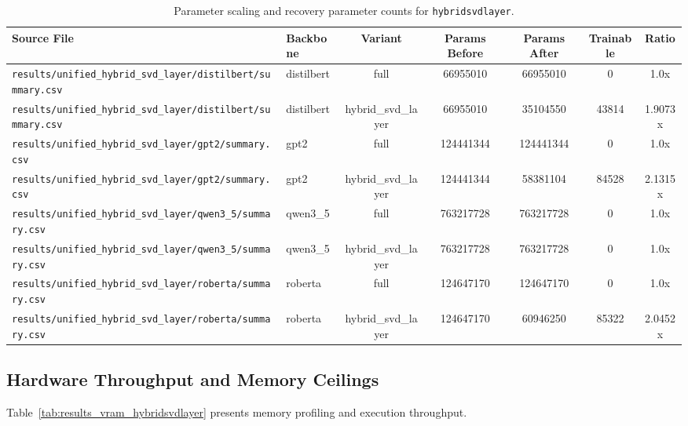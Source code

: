 \begin{table}[t]
\centering
\small
\begin{tabular}{llccccc}
\toprule
\textbf{Source File} & \textbf{Backbone} & \textbf{Variant} & \textbf{Params Before} & \textbf{Params After} & \textbf{Trainable} & \textbf{Ratio} \\
\midrule
\texttt{results/unified\_hybrid\_svd\_layer/distilbert/summary.csv} & distilbert & full & 66955010 & 66955010 & 0 & 1.0x \\
\texttt{results/unified\_hybrid\_svd\_layer/distilbert/summary.csv} & distilbert & hybrid\_svd\_layer & 66955010 & 35104550 & 43814 & 1.9073x \\
\texttt{results/unified\_hybrid\_svd\_layer/gpt2/summary.csv} & gpt2 & full & 124441344 & 124441344 & 0 & 1.0x \\
\texttt{results/unified\_hybrid\_svd\_layer/gpt2/summary.csv} & gpt2 & hybrid\_svd\_layer & 124441344 & 58381104 & 84528 & 2.1315x \\
\texttt{results/unified\_hybrid\_svd\_layer/qwen3\_5/summary.csv} & qwen3\_5 & full & 763217728 & 763217728 & 0 & 1.0x \\
\texttt{results/unified\_hybrid\_svd\_layer/qwen3\_5/summary.csv} & qwen3\_5 & hybrid\_svd\_layer & 763217728 & 763217728 & 0 & 1.0x \\
\texttt{results/unified\_hybrid\_svd\_layer/roberta/summary.csv} & roberta & full & 124647170 & 124647170 & 0 & 1.0x \\
\texttt{results/unified\_hybrid\_svd\_layer/roberta/summary.csv} & roberta & hybrid\_svd\_layer & 124647170 & 60946250 & 85322 & 2.0452x \\
\bottomrule
\end{tabular}
\caption{Parameter scaling and recovery parameter counts for \texttt{hybridsvdlayer}.}
\label{tab:results_params_hybridsvdlayer}
\end{table}

\subsection{Hardware Throughput and Memory Ceilings}
Table~\ref{tab:results_vram_hybridsvdlayer} presents memory profiling and execution throughput.

